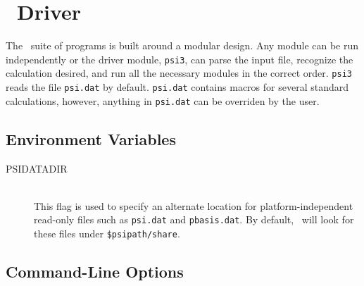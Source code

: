 \section{\PSIthree\ Driver} \label{psi-driver}

The \PSIthree\ suite of programs is built around a modular design. Any module
can be run independently or the driver module, {\tt psi3}, can parse the
input file, recognize the calculation desired, and run all the necessary
modules in the correct order. {\tt psi3} reads the file {\tt psi.dat} by
default. {\tt psi.dat} contains macros for several standard calculations, 
however, anything in {\tt psi.dat} can be overriden by the user.  

\subsection{Environment Variables}

\begin{description}

\item[PSIDATADIR]\mbox{}\\
This flag is used to specify an alternate location for platform-independent
read-only files such as {\tt psi.dat} and {\tt pbasis.dat}.
By default, \PSIthree\ will look for these files under {\tt \$psipath/share}.

\end{description}

\subsection{Command-Line Options}

